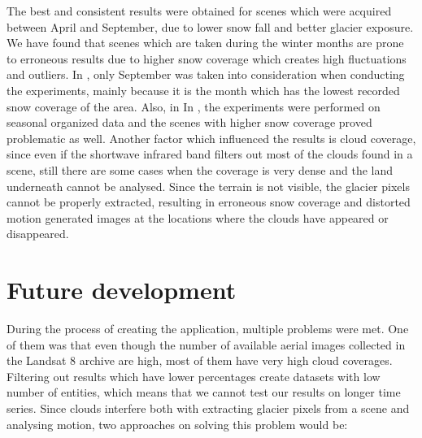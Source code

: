 \documentclass[12pt, a4paper]{report}
\begin{document}
	\par The best and consistent results were obtained for scenes which were acquired between April and September, due to lower snow fall and better glacier exposure. We have found that scenes which are taken during the winter months are prone to erroneous results due to higher snow coverage which creates high fluctuations and outliers. In \cite{TAK2020}, only September was taken into consideration when conducting the experiments, mainly because it is the month which has the lowest recorded snow coverage of the area. Also, in In \cite{RACOVITEANU2019}, the experiments were performed on seasonal organized data and the scenes with higher snow coverage proved problematic as well. Another factor which influenced the results is cloud coverage, since even if the shortwave infrared band filters out most of the clouds found in a scene, still there are some cases when the coverage is very dense and the land underneath cannot be analysed. Since the terrain is not visible, the glacier pixels cannot be properly extracted, resulting in erroneous snow coverage and distorted motion generated images at the locations where the clouds have appeared or disappeared.
	
	\section{Future development}
	
	\par During the process of creating the application, multiple problems were met. One of them was that even though the number of available aerial images collected in the Landsat 8 archive are high, most of them have very high cloud coverages. Filtering out results which have lower percentages create datasets with low number of entities, which means that we cannot test our results on longer time series. Since clouds interfere both with extracting glacier pixels from a scene and analysing motion, two approaches on solving this problem would be:
	
\end{document}
